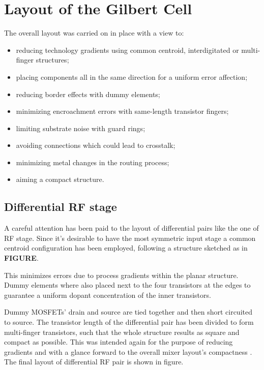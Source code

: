 \section{Layout of the Gilbert Cell}
The overall layout was carried on in place with a view to:
\begin{itemize}
	\item reducing technology gradients using common centroid, interdigitated or multi-finger structures;
	\item placing components all in the same direction for a uniform error affection;
	\item reducing border effects with dummy elements;
	\item minimizing encroachment errors with same-length transistor fingers;
 	\item limiting substrate noise with guard rings;
	\item avoiding connections which could lead to crosstalk;
	\item minimizing metal changes in the routing process;
	\item aiming a compact structure.
\end{itemize}
\subsection{Differential RF stage}
A careful attention has been paid to the layout of differential pairs like the one of RF stage. Since it's desirable to have the most symmetric input stage a common centroid configuration has been employed, following a structure sketched as in \textbf{FIGURE}. 

This minimizes errors due to process gradients within the planar structure. Dummy elements where also placed next to the four transistors at the edges to guarantee a uniform dopant concentration of the inner transistors. 

Dummy MOSFETs' drain and source are tied together and then short circuited to source.
The transistor length of the differential pair has been divided to form multi-finger  transistors, such that the whole structure results as square and compact as possible. This was intended again for the purpose of reducing gradients and with a glance forward to the overall mixer layout's compactness . The final layout of differential RF pair is shown in figure.

